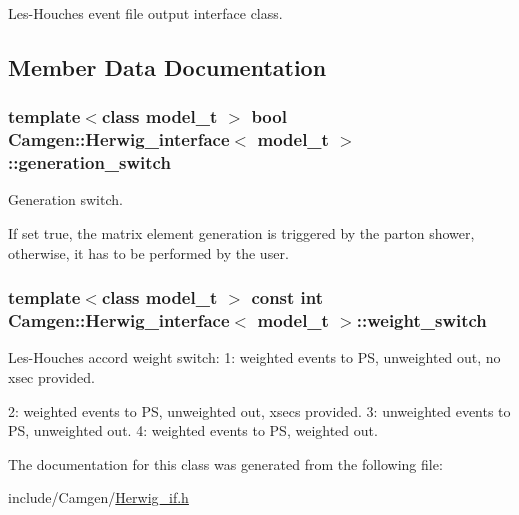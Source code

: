 Les-\/\-Houches event file output interface class. 

\subsection{Member Data Documentation}
\hypertarget{a00279_a6fd3ab282136d8ceb709e5030e9f48a3}{
\subsubsection[{generation\-\_\-switch}]{\setlength{\rightskip}{0pt plus 5cm}template$<$class model\-\_\-t $>$ bool {\bf Camgen\-::\-Herwig\-\_\-interface}$<$ model\-\_\-t $>$\-::generation\-\_\-switch}}\label{a00279_a6fd3ab282136d8ceb709e5030e9f48a3}


Generation switch. 

If set true, the matrix element generation is triggered by the parton shower, otherwise, it has to be performed by the user. \hypertarget{a00279_a2dedaf0e690349d499044ca1aa0ab95b}{
\subsubsection[{weight\-\_\-switch}]{\setlength{\rightskip}{0pt plus 5cm}template$<$class model\-\_\-t $>$ const int {\bf Camgen\-::\-Herwig\-\_\-interface}$<$ model\-\_\-t $>$\-::weight\-\_\-switch}}\label{a00279_a2dedaf0e690349d499044ca1aa0ab95b}


Les-\/\-Houches accord weight switch\-: 1\-: weighted events to P\-S, unweighted out, no xsec provided. 

2\-: weighted events to P\-S, unweighted out, xsecs provided. 3\-: unweighted events to P\-S, unweighted out. 4\-: weighted events to P\-S, weighted out. 

The documentation for this class was generated from the following file\-:\begin{DoxyCompactItemize}
\item 
include/\-Camgen/\hyperlink{a00644}{Herwig\-\_\-if.\-h}\end{DoxyCompactItemize}
